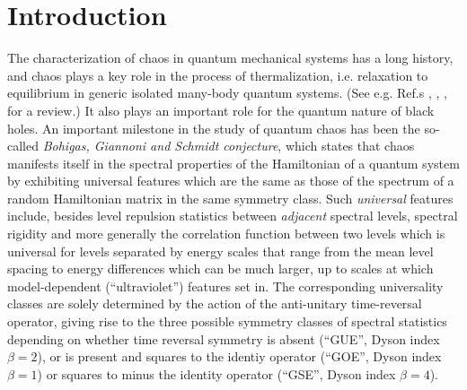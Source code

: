 \documentclass[aps,prb,preprint,onecolumn,amsmath,amssymb,superscriptaddress,eqsecnum,floatfix,scrartcl]{revtex4-1}
\begin{document}
\maketitle   
\tableofcontents



\section{Introduction}
\label{SectionIntroduction}
The characterization of chaos in quantum mechanical systems has a long history,
and chaos plays a key role in  the process of  thermalization, i.e. relaxation to equilibrium in generic  isolated many-body quantum 
systems\cite{Srednicki1994, Deutsch1991}. 
(See e.g. Ref.s ,
, 
,  for a review.)
It also plays an important role for the quantum nature of black holes.\cite{Shenker2013b,Shenker2013a,Shenker2014, Maldacena2015, Kitaev2014,Cotler2016}
An important milestone in the study of quantum chaos has been the so-called 
{\it Bohigas, Giannoni and Schmidt conjecture}\cite{BohigasGiannoniSchmidtConjecture}, which states that chaos manifests itself in the spectral properties of the Hamiltonian of a quantum system by exhibiting
universal  features which are the same as those of the spectrum of a random Hamiltonian matrix  in the same symmetry class.
 Such {\it universal}
features include, besides
 level repulsion statistics between {\it adjacent}  spectral levels, spectral rigidity and more generally
the correlation function between two levels which is universal for  levels separated by
energy scales 
that  range from the mean level spacing 
to energy differences which can be
much 
larger,  up to scales
at which model-dependent (``ultraviolet'') features set in. 
The corresponding  universality classes are solely determined by the action of the anti-unitary time-reversal operator, giving rise to the  three
possible symmetry classes of spectral statistics
depending on whether time reversal symmetry is absent (``GUE'', Dyson index $\beta=2$), or is present and squares to
the identiy operator (``GOE'', Dyson index $\beta=1$) or squares to minus the identity operator (``GSE'', Dyson index $\beta=4$).
\end{document}
